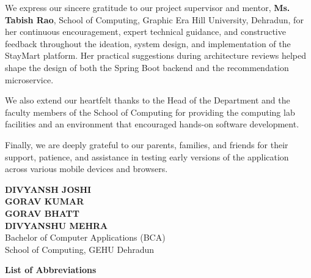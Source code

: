 \documentclass[12pt,a4paper]{report}
\begin{document}
We express our sincere gratitude to our project supervisor and mentor, \textbf{Ms. Tabish Rao}, School of Computing, Graphic Era Hill University, Dehradun, for her continuous encouragement, expert technical guidance, and constructive feedback throughout the ideation, system design, and implementation of the StayMart platform. Her practical suggestions during architecture reviews helped shape the design of both the Spring Boot backend and the recommendation microservice.

We also extend our heartfelt thanks to the Head of the Department and the faculty members of the School of Computing for providing the computing lab facilities and an environment that encouraged hands-on software development.

Finally, we are deeply grateful to our parents, families, and friends for their support, patience, and assistance in testing early versions of the application across various mobile devices and browsers.

\vspace{1.2cm}
\begin{flushright}
    \textbf{DIVYANSH JOSHI} \\
    \textbf{GORAV KUMAR} \\
    \textbf{GORAV BHATT} \\
    \textbf{DIVYANSHU MEHRA} \\
    Bachelor of Computer Applications (BCA) \\
    School of Computing, GEHU Dehradun
\end{flushright}

\newpage
\tableofcontents

\newpage
{}
\begin{center}
    {\fontsize{14pt}{16pt}\selectfont \textbf{List of Abbreviations}\par}
\end{center}
\vspace{0.5cm}
\end{document}
